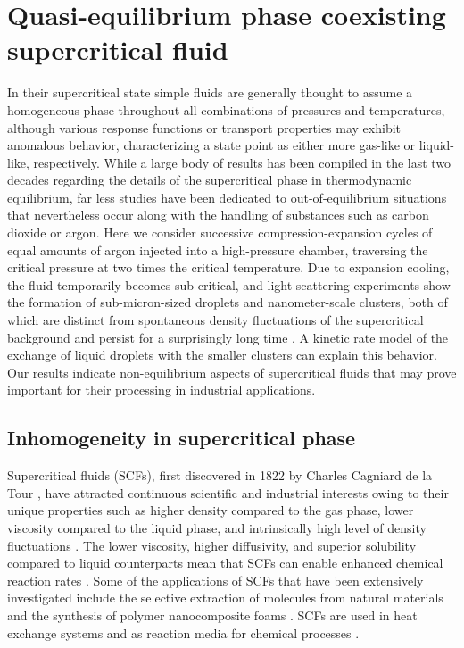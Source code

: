 
\chapter{Quasi-equilibrium phase coexisting supercritical fluid}
\label{sec:ch2}

In their supercritical state simple fluids are generally thought to assume a homogeneous phase throughout all combinations of pressures and temperatures, although various response functions or transport properties may exhibit anomalous behavior, characterizing a state point as either more gas-like or liquid-like, respectively. While a large body of results has been compiled in the last two decades regarding the details of the supercritical phase in thermodynamic equilibrium, far less studies have been dedicated to out-of-equilibrium situations that nevertheless occur along with the handling of substances such as carbon dioxide or argon. Here we consider successive compression-expansion cycles of equal amounts of argon injected into a high-pressure chamber, traversing the critical pressure at two times the critical temperature. Due to expansion cooling, the fluid temporarily becomes sub-critical, and light scattering experiments show the formation of sub-micron-sized droplets and nanometer-scale clusters, both of which are distinct from spontaneous density fluctuations of the supercritical background and persist for a surprisingly long time \cite{lee2021quasi}.  A kinetic rate model of the exchange of liquid droplets with the smaller clusters can explain this behavior. Our results indicate non-equilibrium aspects of supercritical fluids that may prove important for their processing in industrial applications.



\section{Inhomogeneity in supercritical phase}
\label{sec:ch2-1}

Supercritical fluids (SCFs), first discovered in 1822 by Charles Cagniard de la Tour \cite{berche2009critical}, have attracted continuous scientific and industrial interests owing to their unique properties such as higher density compared to the gas phase, lower viscosity compared to the liquid phase, and intrinsically high level of density fluctuations \cite{knez2014industrial, stauss2015review}. The lower viscosity, higher diffusivity, and superior solubility compared to liquid counterparts mean that SCFs can enable enhanced chemical reaction rates \cite{medina2012determination}. Some of the applications of SCFs that have been extensively investigated include the selective extraction of molecules from natural materials \cite{sovova2012steps} and the synthesis of polymer nanocomposite foams \cite{lee2005polymer, matson1987rapid}. SCFs are used in heat exchange systems \cite{duffey2005experimental} and as reaction media for chemical processes \cite{munshi2009supercritical}.

